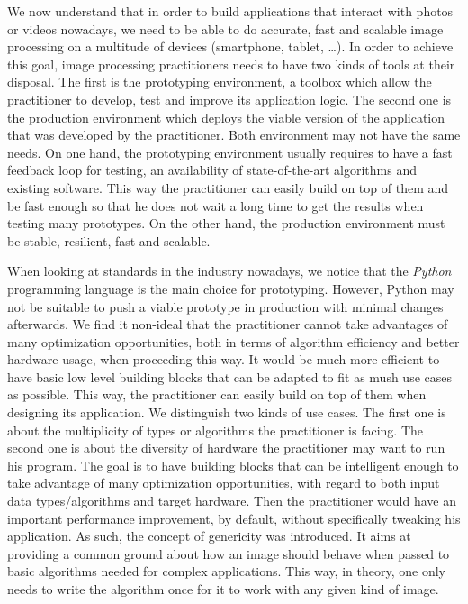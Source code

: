 We now understand that in order to build applications that interact with photos or videos nowadays, we need to be able
to do accurate, fast and scalable image processing on a multitude of devices (smartphone, tablet, \ldots). In order to
achieve this goal, image processing practitioners needs to have two kinds of tools at their disposal. The first is the
prototyping environment, a toolbox which allow the practitioner to develop, test and improve its application logic. The
second one is the production environment which deploys the viable version of the application that was developed by the
practitioner. Both environment may not have the same needs. On one hand, the prototyping environment usually requires to
have a fast feedback loop for testing, an availability of state-of-the-art algorithms and existing software. This way
the practitioner can easily build on top of them and be fast enough so that he does not wait a long time to get the
results when testing many prototypes. On the other hand, the production environment must be stable, resilient, fast and
scalable.

When looking at standards in the industry nowadays, we notice that the \emph{Python} programming language is the main
choice for prototyping. However, Python may not be suitable to push a viable prototype in production with minimal
changes afterwards. We find it non-ideal that the practitioner cannot take advantages of many optimization
opportunities, both in terms of algorithm efficiency and better hardware usage, when proceeding this way. It would be
much more efficient to have basic low level building blocks that can be adapted to fit as mush use cases as possible.
This way, the practitioner can easily build on top of them when designing its application. We distinguish two kinds of
use cases. The first one is about the multiplicity of types or algorithms the practitioner is facing. The second one is
about the diversity of hardware the practitioner may want to run his program. The goal is to have building blocks that
can be intelligent enough to take advantage of many optimization opportunities, with regard to both input data
types/algorithms and target hardware. Then the practitioner would have an important performance improvement, by default,
without specifically tweaking his application. As such, the concept of genericity was introduced. It aims at providing a
common ground about how an image should behave when passed to basic algorithms needed for complex applications. This
way, in theory, one only needs to write the algorithm once for it to work with any given kind of image.

